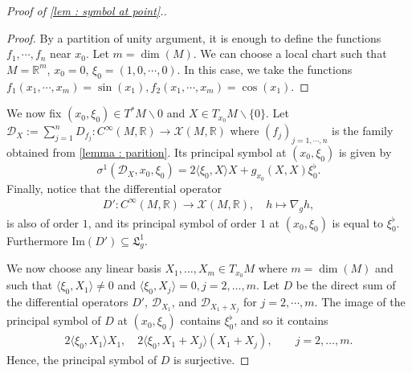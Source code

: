 \documentclass[10pt]{article}
\newcommand{\la}{\langle}
\newcommand{\ra}{\rangle}
\newcommand{\R}{{\mathbb R}}
\newcommand{\Chi}{{\mathcal X}}
\newcommand{\LL}{{\mathfrak L}}
\begin{document}
\begin{proof}[Proof of \cref{lem : symbol at point}.]
\begin{proof}
        By a partition of unity argument, it is enough to define the functions $f_1,\cdots,f_n$ near $x_0$.
        Let $m=\dim(M)$.
        We can choose a local chart such that $M=\R^{m}$, $x_0=0$, $\xi_0=(1,0,\cdots,0)$.
        In this case, we take the functions $f_1(x_1,\cdots,x_m)=\sin(x_1),f_2(x_1,\cdots,x_m)=\cos(x_1)$.
    \end{proof}
    We now fix $(x_0,\xi_0)\in T^*M\backslash 0$ and $X\in T_{x_0}M\backslash \{0\}$. Let $\mathcal{D}_X:=\sum_{j=1}^nD_{f_j}:C^\infty(M,\R)\to \Chi(M,\R)$ where $(f_j)_{j=1,\cdots,n}$ is the family obtained from \cref{lemma : parition}. Its principal symbol at $(x_0,\xi_0)$ is given by
    \begin{equation*}
        \sigma^1(\mathcal{D}_X,x_0,\xi_0)=2\la \xi_0,X\ra X+g_{x_0}(X,X)\xi_0^\flat.
    \end{equation*}
    Finally, notice that the differential operator
    \begin{equation*}\begin{aligned}
            D':C^\infty(M,\R)\to \Chi(M,\R),\quad h\mapsto  \nabla_gh,
        \end{aligned}\end{equation*}
    is also of order $1$, and its principal symbol of order $1$ at $(x_0,\xi_0)$ is equal to $\xi^\flat_0$. Furthermore $\mathrm{Im}(D')\subseteq \LL_g^1$.

    We now choose any linear basis $X_1,\dots,X_m\in T_{x_0}M$ where $m=\dim(M)$ and such that $\langle \xi_0,X_1\rangle\neq 0$ and $\langle \xi_0,X_j\rangle=0, j=2,\dots,m$.
    Let $D$ be the direct sum of the differential operators $D'$, $\mathcal{D}_{X_1}$, and $\mathcal{D}_{X_1+X_j}$ for $j=2,\cdots,m$.
    The image of the principal symbol of $D$ at $(x_0,\xi_0)$ contains $\xi_0^\flat$, and  so it contains
    \begin{equation*}\begin{aligned}
            2\la \xi_0,X_1\ra X_1,\quad 2\la \xi_0,X_1+X_j\ra (X_1+X_j), \qquad j=2,\dots,m.
        \end{aligned}\end{equation*}
    Hence, the principal symbol of $D$ is surjective.
\end{proof}
\end{document}
